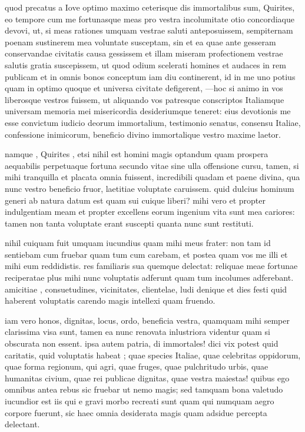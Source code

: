 
 quod precatus a Iove optimo maximo ceterisque dis immortalibus sum, Quirites, eo tempore cum me fortunasque meas pro vestra incolumitate otio concordiaque devovi, ut, si meas rationes umquam vestrae saluti anteposuissem, sempiternam poenam sustinerem mea voluntate susceptam, sin et ea quae ante gesseram conservandae civitatis causa gessissem et illam miseram profectionem vestrae salutis gratia suscepissem, ut quod odium scelerati homines et audaces in rem publicam et in omnis bonos conceptum iam diu continerent, id in me uno potius quam in optimo quoque et universa civitate defigerent, —hoc si animo in vos liberosque vestros fuissem, ut aliquando vos patresque conscriptos Italiamque universam memoria mei misericordia desideriumque teneret: eius devotionis me esse convictum iudicio deorum immortalium, testimonio senatus, consensu Italiae, confessione inimicorum, beneficio divino immortalique vestro maxime laetor.

 namque , Quirites , etsi nihil est homini magis optandum quam prospera aequabilis perpetuaque fortuna secundo vitae sine ulla offensione cursu, tamen, si mihi tranquilla et placata omnia fuissent, incredibili quadam et paene divina, qua nunc vestro beneficio fruor, laetitiae voluptate caruissem. quid dulcius hominum generi ab natura datum est quam sui cuique liberi? mihi vero et propter indulgentiam meam et propter excellens eorum ingenium vita sunt mea cariores: tamen non tanta voluptate erant suscepti quanta nunc sunt restituti.

 nihil cuiquam fuit umquam iucundius quam mihi meus frater: non tam id sentiebam cum fruebar quam tum cum carebam, et postea quam vos me illi et mihi eum reddidistis. res familiaris sua quemque delectat: reliquae meae fortunae reciperatae plus mihi nunc voluptatis adferunt quam tum incolumes adferebant. amicitiae , consuetudines, vicinitates, clientelae, ludi denique et dies festi quid haberent voluptatis carendo magis intellexi quam fruendo.

 iam vero honos, dignitas, locus, ordo, beneficia vestra, quamquam mihi semper clarissima visa sunt, tamen ea nunc renovata inlustriora videntur quam si obscurata non essent. ipsa autem patria, di immortales! dici vix potest quid caritatis, quid voluptatis habeat ; quae species Italiae, quae celebritas oppidorum, quae forma regionum, qui agri, quae fruges, quae pulchritudo urbis, quae humanitas civium, quae rei publicae dignitas, quae vestra maiestas! quibus ego omnibus antea rebus sic fruebar ut nemo magis; sed tamquam bona valetudo iucundior est iis qui e gravi morbo recreati sunt quam qui numquam aegro corpore fuerunt, sic haec omnia desiderata magis quam adsidue percepta delectant.

